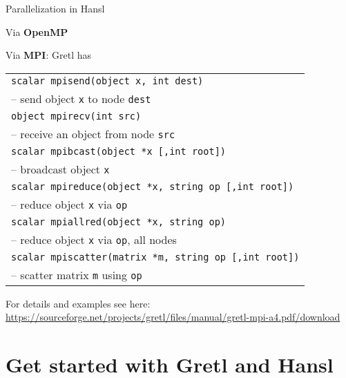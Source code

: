 \documentclass{beamer}[11pt]
\begin{document}
\begin{frame}{Parallelization in Hansl}
	
	Via \textbf{OpenMP}
	
	\medskip
	
	Via \textbf{MPI}: Gretl has
	
	
	{\footnotesize
		\begin{tabular}{l}
			\texttt{scalar mpisend(object x, int dest)} \\ 
			\qquad  -- send object \texttt{x} to node \texttt{dest}\\
			\texttt{object mpirecv(int src)} \\ 
			\qquad  -- receive an object from node \texttt{src} \\
			\texttt{scalar mpibcast(object *x [,int root])} \\ 
			\qquad  -- broadcast object \texttt{x} \\
			\texttt{scalar mpireduce(object *x, string op [,int root])} \\ 
			\qquad  -- reduce object \texttt{x} via \texttt{op} \\
			\texttt{scalar mpiallred(object *x, string op)} \\
			\qquad  -- reduce object \texttt{x} via \texttt{op}, all nodes \\
			\texttt{scalar mpiscatter(matrix *m, string op [,int root])} \\ 
			\qquad  -- scatter matrix \texttt{m} using \texttt{op} \\
		\end{tabular}
	}
	\medskip
	
	For details and examples see here: \url{https://sourceforge.net/projects/gretl/files/manual/gretl-mpi-a4.pdf/download}
\end{frame}


\section{Get started with Gretl and Hansl}
\end{document}
